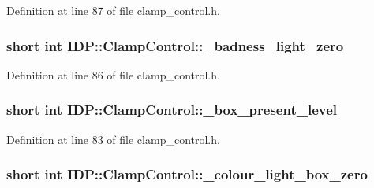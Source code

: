 Definition at line 87 of file clamp\_\-control.h.

\hypertarget{classIDP_1_1ClampControl_a1391b175b26be6760be280f8e1b8bd4c}{
\subsubsection[{\_\-badness\_\-light\_\-zero}]{\setlength{\rightskip}{0pt plus 5cm}short int {\bf IDP::ClampControl::\_\-badness\_\-light\_\-zero}}}
\label{classIDP_1_1ClampControl_a1391b175b26be6760be280f8e1b8bd4c}


Definition at line 86 of file clamp\_\-control.h.

\hypertarget{classIDP_1_1ClampControl_a486cebcf52979b03361cce9ecb84f2e3}{
\subsubsection[{\_\-box\_\-present\_\-level}]{\setlength{\rightskip}{0pt plus 5cm}short int {\bf IDP::ClampControl::\_\-box\_\-present\_\-level}}}
\label{classIDP_1_1ClampControl_a486cebcf52979b03361cce9ecb84f2e3}


Definition at line 83 of file clamp\_\-control.h.

\hypertarget{classIDP_1_1ClampControl_acca5d1d3e3e3fc8b148a4889c76b0dc2}{
\subsubsection[{\_\-colour\_\-light\_\-box\_\-zero}]{\setlength{\rightskip}{0pt plus 5cm}short int {\bf IDP::ClampControl::\_\-colour\_\-light\_\-box\_\-zero}}}
\label{classIDP_1_1ClampControl_acca5d1d3e3e3fc8b148a4889c76b0dc2}



